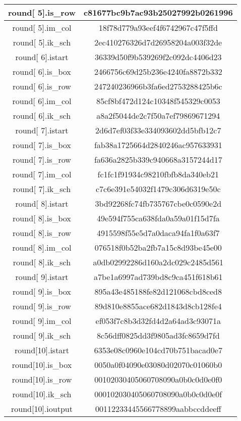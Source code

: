\begin{center}
\begin{longtable}{|c|c|}
\hline
round[ 5].is\_row&   c81677bc9b7ac93b25027992b0261996\\
\hline
round[ 5].im\_col&   18f78d779a93eef4f6742967c47f5ffd\\
\hline
round[ 5].ik\_sch&   2ec410276326d7d26958204a003f32de\\
\hline
round[ 6].istart&   36339d50f9b539269f2c092dc4406d23\\
\hline
round[ 6].is\_box&   2466756c69d25b236e4240fa8872b332\\
\hline
round[ 6].is\_row&   247240236966b3fa6ed2753288425b6c\\
\hline
round[ 6].im\_col&   85cf8bf472d124c10348f545329c0053\\
\hline
round[ 6].ik\_sch&   a8a2f5044de2c7f50a7ef79869671294\\
\hline
round[ 7].istart&   2d6d7ef03f33e334093602dd5bfb12c7\\
\hline
round[ 7].is\_box&   fab38a1725664d2840246ac957633931\\
\hline
round[ 7].is\_row&   fa636a2825b339c940668a3157244d17\\
\hline
round[ 7].im\_col&   fc1fc1f91934c98210fbfb8da340eb21\\
\hline
round[ 7].ik\_sch&   c7c6e391e54032f1479c306d6319e50c\\
\hline
round[ 8].istart&   3bd92268fc74fb735767cbe0c0590e2d\\
\hline
round[ 8].is\_box&   49e594f755ca638fda0a59a01f15d7fa\\
\hline
round[ 8].is\_row&   4915598f55e5d7a0daca94fa1f0a63f7\\
\hline
round[ 8].im\_col&   076518f0b52ba2fb7a15c8d93be45e00\\
\hline
round[ 8].ik\_sch&   a0db02992286d160a2dc029c2485d561\\
\hline
round[ 9].istart&   a7be1a6997ad739bd8c9ca451f618b61\\
\hline
round[ 9].is\_box&   895a43e485188fe82d121068cbd8ced8\\
\hline
round[ 9].is\_row&   89d810e8855ace682d1843d8cb128fe4\\
\hline
round[ 9].im\_col&   ef053f7c8b3d32fd4d2a64ad3c93071a\\
\hline
round[ 9].ik\_sch&   8c56dff0825dd3f9805ad3fc8659d7fd\\
\hline
round[10].istart&   6353e08c0960e104cd70b751bacad0e7\\
\hline
round[10].is\_box&   0050a0f04090e03080d02070c01060b0\\
\hline
round[10].is\_row&   00102030405060708090a0b0c0d0e0f0\\
\hline
round[10].ik\_sch&   000102030405060708090a0b0c0d0e0f\\
\hline
round[10].ioutput&  00112233445566778899aabbccddeeff\\
\hline
\end{longtable}
\end{center}

